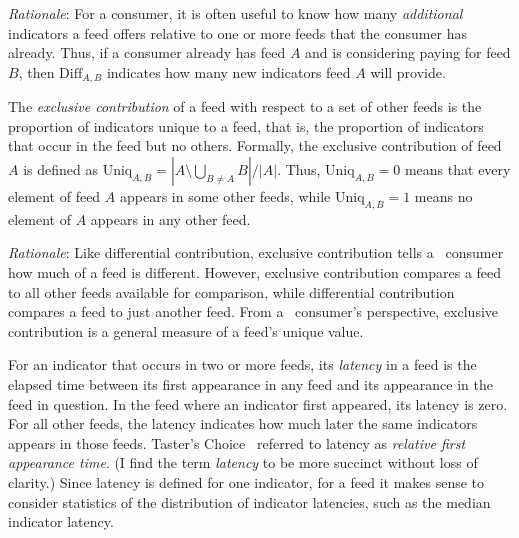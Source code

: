 
\emph{Rationale}: For a consumer, it is often useful to know how many \emph{additional}
indicators a feed offers relative to one or more feeds that the consumer has already.
Thus, if a consumer already has feed $A$ and is considering paying for feed $B$,
then $\mathrm{Diff}_{A,B}$ indicates how many new indicators feed $A$ will provide.

\metrics {} The \emph{exclusive contribution} of
a feed with respect to a set of other feeds is the proportion of indicators
unique to a feed, that is, the proportion of indicators that occur in the feed
but no others. Formally, the exclusive contribution of feed $A$
is defined as $\mathrm{Uniq}_{A,B} = |A \setminus \bigcup_{B\neq A}B|/|A|$.
Thus, $\mathrm{Uniq}_{A,B} = 0$ means that every element of feed $A$ appears in
some other feeds, while $\mathrm{Uniq}_{A,B}=1$ means no element of $A$ appears
in any other feed.


\emph{Rationale}: Like differential contribution, exclusive contribution tells
a \ti\ consumer how much of a feed is different. However, exclusive contribution
compares a feed to all other feeds available for comparison, while differential
contribution compares a feed to just another feed. From a \ti\ consumer's
perspective, exclusive contribution is a general measure of a feed's unique
value.

\metrics {} For an indicator that occurs in two or more feeds, its
\emph{latency} in a feed is the elapsed time between its first appearance in any
feed and its appearance in the feed in question. In the feed where an indicator
first appeared, its latency is zero. For all other feeds, the latency indicates
how much later the same indicators appears in those feeds. Taster's
Choice~\cite{tasters:imc12} referred to latency as \emph{relative first appearance
time}. (I find the term \emph{latency} to be more succinct without loss of
clarity.) Since latency is defined for one indicator, for a feed it makes sense
to consider statistics of the distribution of indicator latencies, such as the
median indicator latency.

